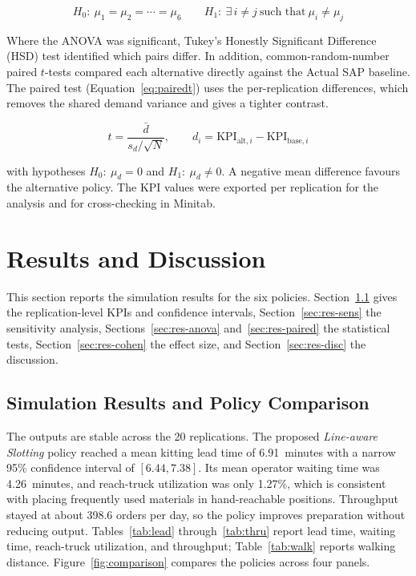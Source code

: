 \documentclass[12pt,a4paper]{article}
\newcommand{\policy}[1]{\textit{#1}}
\begin{document}
\begin{equation}
\label{eq:anovah}
H_0:\ \mu_1=\mu_2=\cdots=\mu_6
\qquad
H_1:\ \exists\, i\neq j \ \text{such that}\ \mu_i\neq\mu_j
\end{equation}

Where the ANOVA was significant, Tukey's Honestly Significant Difference (HSD)
test identified which pairs differ. In addition, common-random-number paired
$t$-tests compared each alternative directly against the Actual SAP baseline.
The paired test (Equation~\eqref{eq:pairedt}) uses the per-replication
differences, which removes the shared demand variance and gives a tighter
contrast.

\begin{equation}
\label{eq:pairedt}
t = \frac{\bar{d}}{s_d/\sqrt{N}}, \qquad
d_i = \mathrm{KPI}_{\text{alt},i} - \mathrm{KPI}_{\text{base},i}
\end{equation}

\noindent with hypotheses $H_0:\ \mu_d=0$ and $H_1:\ \mu_d\neq0$. A negative
mean difference favours the alternative policy. The KPI values were exported
per replication for the analysis and for cross-checking in Minitab.

\section{Results and Discussion}
\label{sec:results}
This section reports the simulation results for the six policies.
Section~\ref{sec:res-comp} gives the replication-level KPIs and confidence
intervals, Section~\ref{sec:res-sens} the sensitivity analysis,
Sections~\ref{sec:res-anova} and~\ref{sec:res-paired} the statistical tests,
Section~\ref{sec:res-cohen} the effect size, and Section~\ref{sec:res-disc}
the discussion.

\subsection{Simulation Results and Policy Comparison}
\label{sec:res-comp}
The outputs are stable across the 20 replications. The proposed
\policy{Line-aware Slotting} policy reached a mean kitting lead time of
6.91~minutes with a narrow 95\% confidence interval of $[6.44, 7.38]$. Its
mean operator waiting time was 4.26~minutes, and reach-truck utilization was
only 1.27\%, which is consistent with placing frequently used materials in
hand-reachable positions. Throughput stayed at about 398.6 orders per day, so
the policy improves preparation without reducing output. Tables~\ref{tab:lead}
through~\ref{tab:thru} report lead time, waiting time, reach-truck
utilization, and throughput; Table~\ref{tab:walk} reports walking distance.
Figure~\ref{fig:comparison} compares the policies across four panels.
\end{document}
